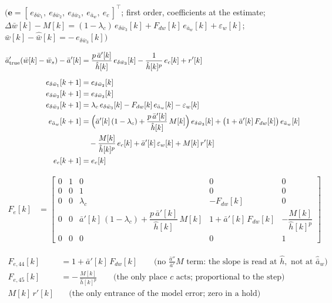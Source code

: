\documentclass[11pt,a4paper,fontset=none]{ctexart}
\newcommand{\ba}{\bar{a}}
\newcommand{\bw}{\bar{w}}
\newcommand{\dW}{\Delta\bw}
\newcommand{\ap}{\ba'}
\newcommand{\app}{\ba''}
\newcommand{\ah}{\hat{\ba}_w}
\newcommand{\wh}{\hat{\bw}}
\newcommand{\hh}{\hat{h}}
\begin{document}
$\bigl(\mathbf{e} = [\,e_{\delta\bw_1},\ e_{\delta\bw_2},\ e_{\delta\bw_3},\ e_{\ba_w},\ e_c\,]^{\top}$; first order, coefficients at the estimate;
$\dW[k] - M[k] = (1-\lambda_c)\,e_{\delta\bw_3}[k] + F_{dw}[k]\,e_{\ba_w}[k] + \varepsilon_w[k]$;
$\bw[k] - \wh[k] = -\,e_{\delta\bw_3}[k]\bigr)$

\begin{align*}
\ap_{\mathrm{true}}(\bw[k]-\bw_s) - \ap[k] &= \frac{p\,\ap[k]}{\hh[k]}\,e_{\delta\bw_3}[k] - \frac{1}{\hh[k]^{p}}\,e_c[k] + r'[k] \\[6pt]
e_{\delta\bw_1}[k+1] &= e_{\delta\bw_2}[k] \\
e_{\delta\bw_2}[k+1] &= e_{\delta\bw_3}[k] \\
e_{\delta\bw_3}[k+1] &= \lambda_c\,e_{\delta\bw_3}[k] - F_{dw}[k]\,e_{\ba_w}[k] - \varepsilon_w[k] \\
e_{\ba_w}[k+1]       &= \Bigl(\ap[k]\,(1-\lambda_c) + \frac{p\,\ap[k]}{\hh[k]}\,M[k]\Bigr)\,e_{\delta\bw_3}[k]
                        + \bigl(1 + \ap[k]\,F_{dw}[k]\bigr)\,e_{\ba_w}[k] \\
                     &\quad - \frac{M[k]}{\hh[k]^{p}}\,e_c[k]
                        + \ap[k]\,\varepsilon_w[k] + M[k]\,r'[k] \\
e_c[k+1]             &= e_c[k]
\end{align*}

\begin{align*}
F_e[k] &= \begin{bmatrix}
0 & 1 & 0 & 0 & 0 \\
0 & 0 & 1 & 0 & 0 \\
0 & 0 & \lambda_c & -F_{dw}[k] & 0 \\
0 & 0 & \ap[k]\,(1-\lambda_c) + \dfrac{p\,\ap[k]}{\hh[k]}\,M[k] & 1 + \ap[k]\,F_{dw}[k] & -\dfrac{M[k]}{\hh[k]^{p}} \\
0 & 0 & 0 & 0 & 1
\end{bmatrix}
\end{align*}

\begin{align*}
F_{e,44}[k] &= 1 + \ap[k]\,F_{dw}[k]
\qquad\text{(no } \tfrac{\app}{\ap}M \text{ term: the slope is read at } \hh, \text{ not at } \ah\text{)} \\
F_{e,45}[k] &= -\,\frac{M[k]}{\hh[k]^{p}}
\qquad\text{(the only place } c \text{ acts; proportional to the step)} \\
M[k]\,r'[k] &\quad\text{(the only entrance of the model error; zero in a hold)}
\end{align*}
\end{document}
